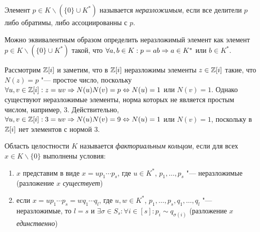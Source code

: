 \begin{definition}
	Элемент $p \in K \backslash (\{0\} \cup K^*)$ называется \textit{неразложимым}, если все делители $p$ либо обратимы, либо ассоциированны с $p$.
\end{definition}

\begin{note}
	Можно эквивалентным образом определить неразложимый элемент как элемент $p \in K \backslash (\{0\} \cup K^*)$ такой, что $\forall a, b \in K: p = ab \Rightarrow a \in K^*$ или $b \in K^*$.
\end{note}

\begin{example}
	Рассмотрим $\mathbb{Z}[i]$ и заметим, что в $\mathbb{Z}[i]$ неразложимы элементы $z \in \mathbb{Z}[i]$ такие, что $N(z) = p$ "--- простое число, поскольку $\forall u, v \in \mathbb{Z}[i]: z = uv \Rightarrow N(u)N(v) = p \Leftrightarrow N(u) = 1$ или $N(v) = 1$. Однако существуют неразложимые элементы, норма которых не является простым числом, например, 3. Действительно, $\forall u, v \in \Z[i]: 3 = uv \ra N(u)N(v) = 9 \hm\lra N(u) = 1$ или $N(v) = 1$, поскольку в $\mathbb{Z}[i]$ нет элементов с нормой 3.
\end{example}

\begin{definition}
	Область целостности $K$ называется \textit{факториальным кольцом}, если для всех $x \in K \backslash \{0\}$ выполнены условия:
	\begin{enumerate}
		\item $x$ представим в виде $x = up_1\dotsm p_s$, где $u \in K^*$, $p_1, \dotsc, p_s$ "--- неразложимые (разложение $x$ \textit{существует})
		\item если $x = up_1\dotsm p_s = wq_1 \dotsm q_l$, где $u, w \in K^*$, $p_1, \dotsc, p_s, q_1, \dotsc, q_l$ "--- неразложимые, то $l = s$ и $\exists \sigma \in S_s: \forall i \in [s]: p_i \sim q_{\sigma(i)}$ (разложение $x$ \textit{единственно})
	\end{enumerate}
\end{definition}

